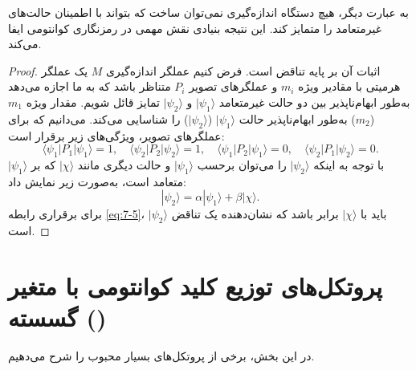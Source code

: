به عبارت دیگر، هیچ دستگاه اندازه‌گیری نمی‌توان ساخت که بتواند با اطمینان حالت‌های غیرمتعامد را متمایز کند. این نتیجه بنیادی نقش مهمی در رمزنگاری کوانتومی ایفا می‌کند.

\begin{proof}
	\label{proof:7-2}
	اثبات آن بر پایه تناقض است. فرض کنیم عملگر اندازه‌گیری $M$ یک عملگر هرمیتی با مقادیر ویژه $m_i$ و عملگرهای تصویر $P_i$ متناظر باشد که به ما اجازه می‌دهد به‌طور ابهام‌ناپذیر بین دو حالت غیرمتعامد $|\psi_1\rangle$ و $|\psi_2\rangle$ تمایز قائل شویم. مقدار ویژه $m_1$ ($m_2$) به‌طور ابهام‌ناپذیر حالت $|\psi_1\rangle$ ($|\psi_2\rangle$) را شناسایی می‌کند. می‌دانیم که برای عملگرهای تصویر، ویژگی‌های زیر برقرار است:
	\begin{equation}
		\langle \psi_1 | P_1 | \psi_1 \rangle = 1, \quad \langle \psi_2 | P_2 | \psi_2 \rangle = 1, \quad \langle \psi_1 | P_2 | \psi_1 \rangle = 0, \quad \langle \psi_2 | P_1 | \psi_2 \rangle = 0.
		\label{eq:7-5}
	\end{equation}
	با توجه به اینکه $|\psi_2\rangle$ را می‌توان برحسب $|\psi_1\rangle$ و حالت دیگری مانند $|\chi\rangle$ که بر $|\psi_1\rangle$ متعامد است، به‌صورت زیر نمایش داد:
	\begin{equation}
		|\psi_2\rangle = \alpha |\psi_1\rangle + \beta |\chi\rangle.
		\label{eq:7-6}
	\end{equation}
	برای برقراری رابطه \eqref{eq:7-5}، $|\psi_2\rangle$ باید با $|\chi\rangle$ برابر باشد که نشان‌دهنده یک تناقض است.
\end{proof}






\section{پروتکل‌های توزیع کلید کوانتومی با متغیر گسسته ()}
\label{sec:7-3}
در این بخش، برخی از پروتکل‌های بسیار محبوب  را شرح می‌دهیم.

